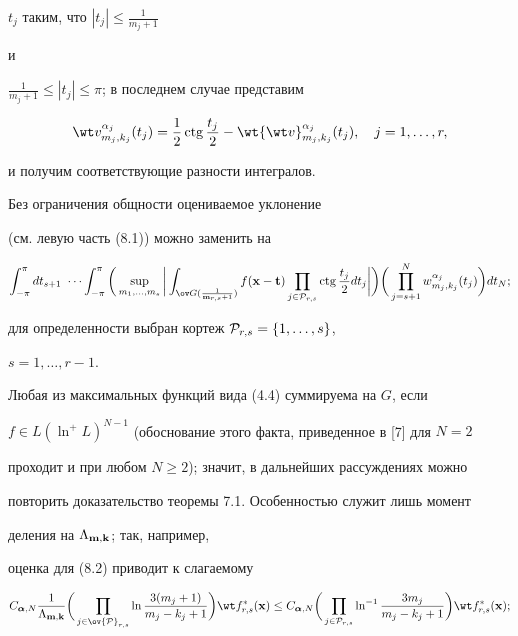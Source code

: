 $t_j$ таким, что $|t_j|\le \frac {1}{m_j+1}$


и


$\frac {1}{m_j+1}\le |t_j|\le \pi$; в последнем случае представим


$$


\wt v_{m_j,k_j}^{\alpha_j}(t_j)=\frac {1}{2} \ctg \frac {t_j}{2}-


\wt {\wt v}_{m_j,k_j}^{\alpha_j}(t_j),\quad j=1,\dotsc,r,


$$


и получим соответствующие разности интегралов.


Без ограничения общности оцениваемое уклонение


(см. левую часть (8.1)) можно заменить на


\begin{equation}


\int_{-\pi}^{\pi}dt_{s+1}\ \dotsb\int_{-\pi}^{\pi}


\bigg(\sup_{m_1,\dotsc,m_s}\bigg|\int_{\ov G(\frac{1}{{\bold m}_{r,s}+1})}


f({\bold x}-{\bold t})\prod_{j\in {\cal P}_{r,s}} \ctg \frac {t_j}{2} dt_j


\bigg|\bigg)


\bigg(\prod_{j=s+1}^N w_{m_j,k_j}^{\alpha_j}(t_j)\bigg)d t_N;


\end{equation}


для определенности выбран кортеж ${\cal P}_{r,s}=\{1,\dotsc,s\}$,


$s=1,\dotsc,r-1$.


Любая из максимальных функций вида (4.4) суммируема на $G$, если


$f\in L(\ln^+L)^{N-1}$ (обоснование этого факта, приведенное в [7] для $N=2$


проходит и при любом $N\ge 2$); значит, в дальнейших рассуждениях можно


повторить доказательство теоремы 7.1. Особенностью служит лишь момент


деления на $\Lambda_{{\bold m},{\bold k}}$; так, например,


оценка для (8.2) приводит к слагаемому


\begin{equation}


C_{{\boldsymbol {\alpha}},N}\frac {1}{\Lambda_{{\bold m},{\bold k}}}


\bigg(\prod_{j\in \ov {\cal P}_{r,s}}


\ln \frac{3(m_j+1)}{m_j-k_j+1}\bigg) \wt f^*_{r,s}({\bold x})\le


C_{{\boldsymbol {\alpha}},N}\bigg(\prod_{j\in {\cal P}_{r,s}}


\ln^{-1} \frac{3 m_j}{m_j-k_j+1}\bigg) \wt f^*_{r,s}({\bold x});


\end{equation}


